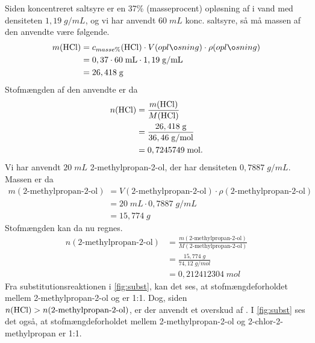 \documentclass{report}
\begin{document}
Siden koncentreret saltsyre er en 37\% (masseprocent) opløsning af  i vand med densiteten $1,19 \;\unit{g/mL} $, og vi har anvendt $60 \;\unit{mL} $ konc. saltsyre, så må massen af den anvendte  være følgende.
\begin{equation*}
\begin{split}
  m(\ce{HCl})&=c_{masse\%}(\ce{HCl}) \cdot V(opløsning) \cdot \rho(opløsning) \\
  &=0,37 \cdot 60 \;\unit{mL} \cdot 1,19 \;\unit{g/mL  } \\
  &= 26,418 \;\unit{g}  
\end{split}
\end{equation*}
Stofmængden af den anvendte  er da
\begin{equation*}
\begin{split}
  n(\ce{HCl}) &= \frac{m(\ce{HCl})}{M(\ce{HCl})} \\ 
  &= \frac{26,418 \;\unit{g}  }{36,46 \;\unit{g/mol} }\\ 
  &= 0,7245749 \;\unit{mol}. 
\end{split}
\end{equation*}
Vi har anvendt $20 \;\unit{mL} $ 2-methylpropan-2-ol, der har densiteten $0,7887 \;\unit{g/mL } $. 
Massen er da
\begin{equation*}
\begin{split}
  m(\text{2-methylpropan-2-ol}) &= V(\text{2-methylpropan-2-ol}) \cdot \rho(\text{2-methylpropan-2-ol}) \\
  &= 20 \;\unit{mL} \cdot 0,7887 \;\unit{g/mL} \\ 
  &= 15,774 \;\unit{g} 
\end{split}
\end{equation*}
Stofmængden kan da nu regnes.
\begin{equation*}
\begin{split}
  n(\text{2-methylpropan-2-ol}) &= \frac{m(\text{2-methylpropan-2-ol})}{M(\text{2-methylpropan-2-ol})} \\ 
  &= \frac{15,774 \;\unit{g}  }{74,12 \;\unit{g/mol} }\\ 
  &= 0,212412304\;\unit{mol} 
\end{split}
\end{equation*}
Fra substitutionsreaktionen i \cref{fig:subst}, kan det ses, at stofmængdeforholdet mellem 2-methylpropan-2-ol og  er 1:1. 
Dog, siden $n(\ce{HCl})>n(\text{2-methylpropan-2-ol})$, er der anvendt et overskud af . 
I \cref{fig:subst} ses det også, at stofmængdeforholdet mellem 2-methylpropan-2-ol og 2-chlor-2-methylpropan er 1:1.
\end{document}
